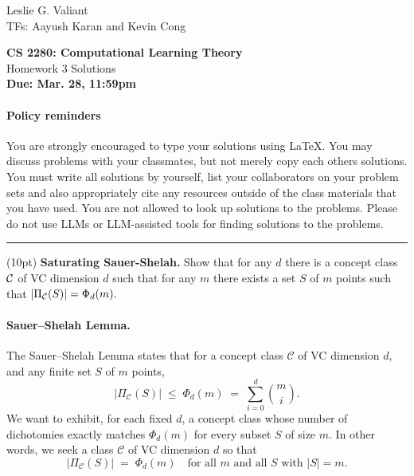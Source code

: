 \documentclass[11pt]{article}
\DeclareMathOperator{\1}{\mathbbm{1}}
\begin{document}
\begin{flushright}
			Leslie G. Valiant \\
			TFs: Aayush Karan and Kevin Cong
\end{flushright}

\begin{center}
\textbf{CS 2280: Computational Learning Theory} \\
Homework 3 Solutions\\
\textbf{Due: Mar. 28, 11:59pm}
\end{center}

\paragraph{Policy reminders} You are strongly encouraged to type your solutions using
\LaTeX. You may discuss problems with your classmates, but not merely copy each others solutions. You must write all solutions by yourself, list your collaborators on your problem sets and also appropriately cite any resources outside of the class materials that you have used. You are not allowed to look up solutions to the problems. Please do not use LLMs or LLM-assisted tools for finding solutions to the problems.

\rule{\linewidth}{0.4pt}

\begin{problem}(10pt) \textbf{Saturating Sauer-Shelah.} Show that for any $d$ there is a concept class ${\cal C}$ of VC dimension $d$
such that for any $m$ there exists a set $S$ of $m$ points such that $|\Pi_{\cal
C}(S)|=\Phi_d(m).$
\end{problem}

\noindent

\paragraph{Sauer--Shelah Lemma.}
The Sauer--Shelah Lemma states that for a concept class $\mathcal{C}$ of VC dimension $d$, and any finite set $S$ of $m$ points,
\[
\lvert \Pi_{\mathcal{C}}(S)\rvert \;\le\; \Phi_d(m) \;=\; \sum_{i=0}^{d}\binom{m}{i}.
\]
We want to exhibit, for each fixed $d$, a concept class whose number of dichotomies exactly matches $\Phi_d(m)$ for every subset $S$ of size $m$. In other words, we seek a class $\mathcal{C}$ of VC dimension $d$ so that
\[
\bigl\lvert \Pi_{\mathcal{C}}(S)\bigr\rvert \;=\;\Phi_d(m)\quad\text{for all $m$ and all $S$ with $\lvert S\rvert = m$.}
\]
\end{document}
